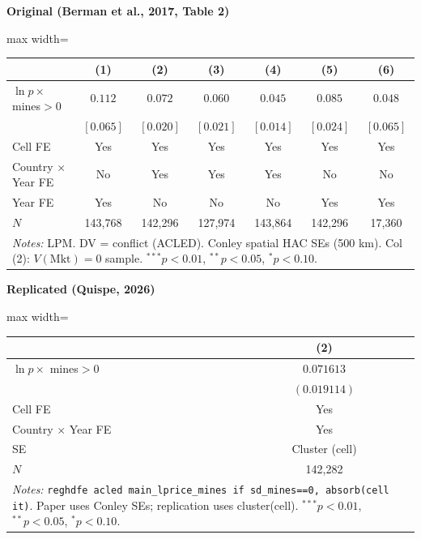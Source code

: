 \documentclass[11pt,a4paper]{article}
\begin{document}
\vspace{0.5cm}
\begin{minipage}[t]{0.48\textwidth}
\centering
\textbf{\large Original (Berman et al., 2017, Table 2)}
\vspace{0.3cm}

\begin{adjustbox}{max width=\textwidth}
\begin{tabular}{lcccccc}
\toprule
 & (1) & (2) & (3) & (4) & (5) & (6) \\
\midrule
$\ln p \times$ mines$>$0 & $0.112$ & $0.072$ & $0.060$ & $0.045$ & $0.085$ & $0.048$ \\
 & $[0.065]$ & $[0.020]$ & $[0.021]$ & $[0.014]$ & $[0.024]$ & $[0.065]$ \\[0.3em]
\midrule
Cell FE & Yes & Yes & Yes & Yes & Yes & Yes \\
Country $\times$ Year FE & No & Yes & Yes & Yes & No & No \\
Year FE & Yes & No & No & No & Yes & Yes \\
$N$ & 143,768 & 142,296 & 127,974 & 143,864 & 142,296 & 17,360 \\
\bottomrule
\multicolumn{7}{p{0.95\textwidth}}{\footnotesize\textit{Notes:} LPM. DV = conflict (ACLED). Conley spatial HAC SEs (500 km). Col (2): $V(\text{Mkt})=0$ sample. $^{***}p<0.01$, $^{**}p<0.05$, $^{*}p<0.10$.}
\end{tabular}
\end{adjustbox}
\end{minipage}%
\hfill
\begin{minipage}[t]{0.48\textwidth}
\centering
\textbf{\large Replicated (Quispe, 2026)}
\vspace{0.3cm}

\begin{adjustbox}{max width=\textwidth}
\begin{tabular}{lc}
\toprule
 & (2) \\
\midrule
$\ln p \times$ mines$>$0 & $0.071613$ \\
 & $(0.019114)$ \\[0.3em]
\midrule
Cell FE & Yes \\
Country $\times$ Year FE & Yes \\
SE & Cluster (cell) \\
$N$ & 142,282 \\
\bottomrule
\multicolumn{2}{p{0.95\textwidth}}{\footnotesize\textit{Notes:} \texttt{reghdfe acled main\_lprice\_mines if sd\_mines==0, absorb(cell it)}. Paper uses Conley SEs; replication uses cluster(cell). $^{***}p<0.01$, $^{**}p<0.05$, $^{*}p<0.10$.}
\end{tabular}
\end{adjustbox}
\end{minipage}
\end{document}
